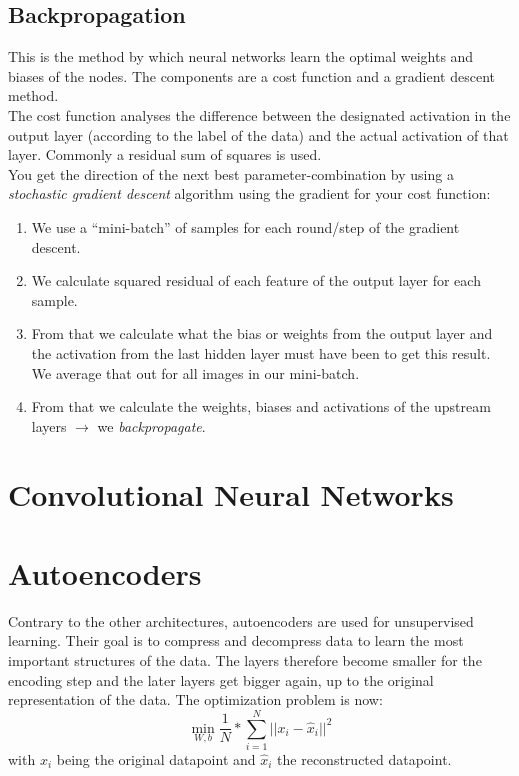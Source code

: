 \documentclass[
]{book}
\begin{document}
\hypertarget{backpropagation}{%
\subsection{Backpropagation}\label{backpropagation}}

This is the method by which neural networks learn the optimal weights
and biases of the nodes. The components are a cost function and a
gradient descent method.\\
The cost function analyses the difference between the designated
activation in the output layer (according to the label of the data) and
the actual activation of that layer. Commonly a residual sum of squares
is used.\\
You get the direction of the next best parameter-combination by using a
\emph{stochastic gradient descent} algorithm using the gradient for your cost
function:

\begin{enumerate}
\def\labelenumi{\arabic{enumi}.}
\item
  We use a ``mini-batch'' of samples for each round/step of the gradient
  descent.
\item
  We calculate squared residual of each feature of the output layer
  for each sample.
\item
  From that we calculate what the bias or weights from the output
  layer and the activation from the last hidden layer must have been
  to get this result. We average that out for all images in our
  mini-batch.
\item
  From that we calculate the weights, biases and activations of the
  upstream layers \(\rightarrow\) we \emph{backpropagate}.
\end{enumerate}

\hypertarget{convolutional-neural-networks}{%
\section{Convolutional Neural Networks}\label{convolutional-neural-networks}}

\hypertarget{autoencoders}{%
\section{Autoencoders}\label{autoencoders}}

Contrary to the other architectures, autoencoders are used for
unsupervised learning. Their goal is to compress and decompress data to
learn the most important structures of the data. The layers therefore
become smaller for the encoding step and the later layers get bigger
again, up to the original representation of the data. The optimization
problem is now:
\[\min_{W,b} \frac{1}{N}*\sum_{i=1}^N ||x_i - \hat{x}_i||^2\] with \(x_i\)
being the original datapoint and \(\hat{x}_i\) the reconstructed
datapoint.
\end{document}
